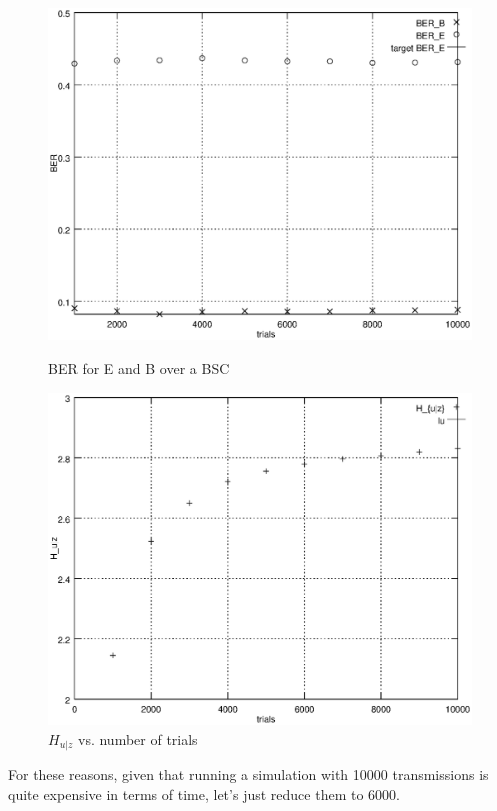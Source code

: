 \documentclass[a4paper,12pt,titlepage]{article}
\begin{document}
\begin{figure}[p]
  \centering
  \includegraphics[scale=0.6]{bsc_ber.eps}
  \caption{BER for E and B over a BSC}
  \label{fig:bsc_ber}

  \centering
  \includegraphics[scale=0.6]{bsc_Hudz.eps}
  \caption{$H_{u|z}$ vs. number of trials}
  \label{fig:bsc_Hudz}
\end{figure}

For these reasons, given that running a simulation with 10000 transmissions is
quite expensive in terms of time, let's just reduce them to 6000.

\newpage
\end{document}
